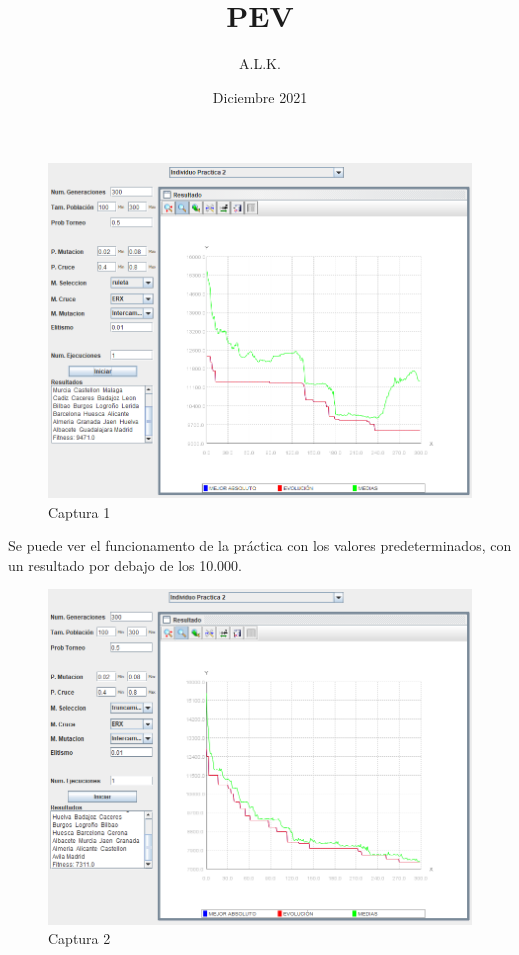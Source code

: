 \documentclass[twoside]{AiTeX}
\title{PEV}
\author{A.L.K.}
\date{Diciembre 2021}
\begin{document}
\portadaApuntes
\pagestyle{empty}
\tableofcontents
\pagestyle{empty}
\justify
\pagestyle{fancy}

\newpage


\begin{figure}[H]
    \centering
    \includegraphics[width = \textwidth]{Images/Captura1.png}
    \caption{Captura 1}
    \label{fig:1}
\end{figure}

Se puede ver el funcionamento de la práctica con los valores predeterminados, con un resultado por debajo de los 10.000.

\begin{figure}[H]
    \centering
    \includegraphics[width = \textwidth]{Images/Captura2.png}
    \caption{Captura 2}
    \label{fig:2}
\end{figure}
\end{document}

